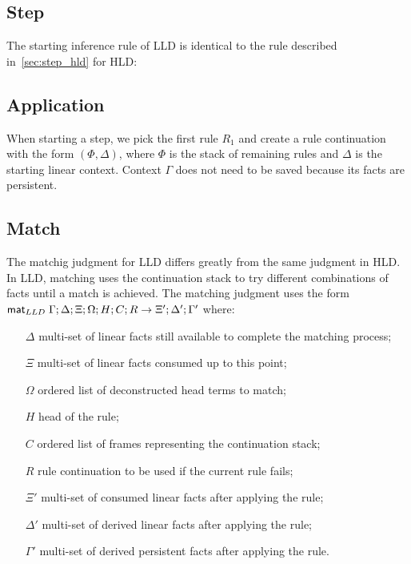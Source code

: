 \subsection{Step}

The starting inference rule of LLD is identical to the rule described
in~\ref{sec:step_hld} for HLD:



\subsection{Application}

When starting a step, we pick the first rule $R_1$ and create a rule
continuation with the form $(\Phi, \Delta)$, where $\Phi$ is the stack of
remaining rules and $\Delta$ is the starting linear context. Context $\Gamma$
does not need to be saved because its facts are persistent.



\subsection{Match}\label{sec:lld_body_match}

The matchig judgment for LLD differs greatly from the same judgment in HLD. In
LLD, matching uses the continuation stack to try different combinations of facts
until a match is achieved. The matching judgment uses the form $\mathsf{mat}_{LLD} \; \Gamma;
\Delta; \Xi; \Omega; H; C; R \rightarrow \Xi'; \Delta'; \Gamma'$ where:

\begin{enumerate}

   \item[$\Delta$] multi-set of linear facts still available to complete the
   matching process;

   \item[$\Xi$] multi-set of linear facts consumed up to this point;

   \item[$\Omega$] ordered list of deconstructed head terms to match;

   \item[$H$] head of the rule;

   \item[$C$] ordered list of frames representing the continuation stack;

   \item[$R$] rule continuation to be used if the current rule fails;

   \item[$\Xi'$] multi-set of consumed linear facts after applying the rule;

   \item[$\Delta'$] multi-set of derived linear facts after applying the rule;

   \item[$\Gamma'$] multi-set of derived persistent facts after applying the
   rule.

\end{enumerate}

